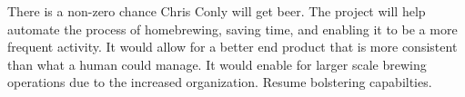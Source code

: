 
There is a non-zero chance Chris Conly will get beer. The project will help automate the process of homebrewing, saving time, and enabling it to be a more frequent activity. It would allow for a better end product that is more consistent than what a human could manage. It would enable for larger scale brewing operations due to the increased organization. Resume bolstering capabilties.